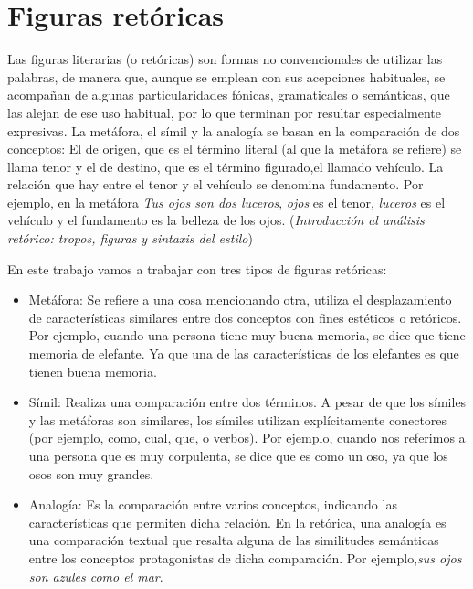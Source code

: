 \section{Figuras retóricas}
Las figuras literarias (o retóricas) son formas no convencionales de utilizar las palabras, de manera que, aunque se emplean con sus acepciones habituales, se acompañan de algunas particularidades fónicas, gramaticales o semánticas, que las alejan de ese uso habitual, por lo que terminan por resultar especialmente expresivas. 
La metáfora, el símil y la analogía se basan en la comparación de dos conceptos: El de origen, que es el término literal (al que la metáfora se refiere) se llama tenor y el de destino, que es el término figurado,el llamado vehículo. La relación que hay entre el tenor y el vehículo se denomina fundamento. Por ejemplo, en la metáfora \textit{Tus ojos son dos luceros}, \textit{ojos} es el tenor, \textit{luceros} es el vehículo y el fundamento es la belleza de los ojos.
(\textit {Introducción al análisis retórico: tropos, figuras y sintaxis del estilo})
\citep{GalianaYCasas1994}

En este trabajo vamos a trabajar con tres tipos de figuras retóricas: 
\begin{itemize}
	\item Metáfora: Se refiere a una cosa mencionando otra, utiliza el desplazamiento de características similares entre dos conceptos con fines estéticos o retóricos. Por ejemplo, cuando una persona tiene muy buena memoria, se dice que tiene memoria de elefante. Ya que una de las características de los elefantes es que tienen buena memoria.
	
	\item Símil: Realiza una comparación entre dos términos. A pesar de que los símiles y las metáforas son similares, los símiles utilizan explícitamente conectores (por ejemplo, como, cual, que, o verbos).
	Por ejemplo, cuando nos referimos a una persona que es muy corpulenta, se dice que es como un oso, ya que los osos son muy grandes.
	
	\item Analogía: Es la comparación entre varios conceptos, indicando las características que permiten dicha relación. En la retórica, una analogía es una comparación textual que resalta alguna de las similitudes semánticas entre los conceptos protagonistas de dicha comparación. Por ejemplo,\textit{sus ojos son azules como el mar}.
	
	
	
\end{itemize}


